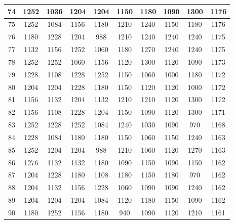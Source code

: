 \documentclass{article}
\begin{document}
\begin{table}
\begin{tabular}{c|c|c|c|c|c|c|c|c|c|}
\multicolumn{1}{|c|}{74}  & 1252 & 1036 & 1204 & 1204 & 1150 & 1180 & 1090 & 1300 & 1176 \\ \hline
\multicolumn{1}{|c|}{75}  & 1252 & 1084 & 1156 & 1180 & 1210 & 1240 & 1150 & 1180 & 1176 \\ \hline
\multicolumn{1}{|c|}{76}  & 1180 & 1228 & 1204 & 988  & 1210 & 1240 & 1240 & 1240 & 1175 \\ \hline
\multicolumn{1}{|c|}{77}  & 1132 & 1156 & 1252 & 1060 & 1180 & 1270 & 1240 & 1240 & 1175 \\ \hline
\multicolumn{1}{|c|}{78}  & 1252 & 1252 & 1060 & 1156 & 1120 & 1300 & 1120 & 1090 & 1173 \\ \hline
\multicolumn{1}{|c|}{79}  & 1228 & 1108 & 1228 & 1252 & 1150 & 1060 & 1000 & 1180 & 1172 \\ \hline
\multicolumn{1}{|c|}{80}  & 1204 & 1204 & 1228 & 1180 & 1150 & 1120 & 1120 & 1000 & 1172 \\ \hline
\multicolumn{1}{|c|}{81}  & 1156 & 1132 & 1204 & 1132 & 1210 & 1210 & 1120 & 1300 & 1172 \\ \hline
\multicolumn{1}{|c|}{82}  & 1156 & 1108 & 1228 & 1204 & 1150 & 1090 & 1120 & 1300 & 1171 \\ \hline
\multicolumn{1}{|c|}{83}  & 1252 & 1228 & 1252 & 1084 & 1240 & 1030 & 1090 & 970  & 1168 \\ \hline
\multicolumn{1}{|c|}{84}  & 1228 & 1084 & 1180 & 1180 & 1150 & 1060 & 1150 & 1240 & 1163 \\ \hline
\multicolumn{1}{|c|}{85}  & 1252 & 1204 & 1204 & 988  & 1210 & 1060 & 1120 & 1270 & 1163 \\ \hline
\multicolumn{1}{|c|}{86}  & 1276 & 1132 & 1132 & 1180 & 1090 & 1150 & 1090 & 1150 & 1162 \\ \hline
\multicolumn{1}{|c|}{87}  & 1204 & 1228 & 1180 & 1108 & 1180 & 1150 & 1180 & 970  & 1162 \\ \hline
\multicolumn{1}{|c|}{88}  & 1204 & 1132 & 1156 & 1228 & 1060 & 1090 & 1090 & 1240 & 1162 \\ \hline
\multicolumn{1}{|c|}{89}  & 1204 & 1204 & 1204 & 1084 & 1120 & 1180 & 1150 & 1090 & 1162 \\ \hline
\multicolumn{1}{|c|}{90}  & 1180 & 1252 & 1156 & 1180 & 940  & 1090 & 1120 & 1210 & 1161 \\ \hline
\end{tabular}
\end{table}
\end{document}
